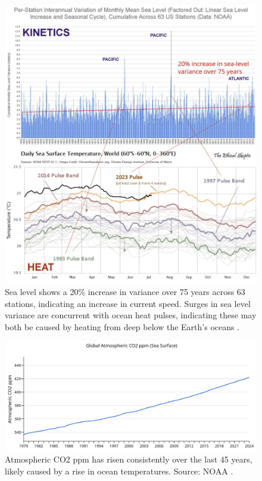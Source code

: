\documentclass[10pt,twocolumn,letterpaper]{article}
\begin{document}
\begin{figure}[t]
\begin{center}
\includegraphics[width=1\textwidth]{sealevel.jpeg}
\end{center}
   \caption{Sea level shows a 20\% increase in variance over 75 years across 63 stations, indicating an increase in current speed. Surges in sea level variance are concurrent with ocean heat pulses, indicating these may both be caused by heating from deep below the Earth's oceans \cite{2,129}.}
\label{fig:22}
\end{figure}

\begin{figure}[t]
\begin{center}
\includegraphics[width=1\textwidth]{co2.jpg}
\end{center}
   \caption{Atmospheric CO2 ppm has risen consistently over the last 45 years, likely caused by a rise in ocean temperatures. Source: NOAA \cite{148,129}.}
\label{fig:23}
\end{figure}
\end{document}
